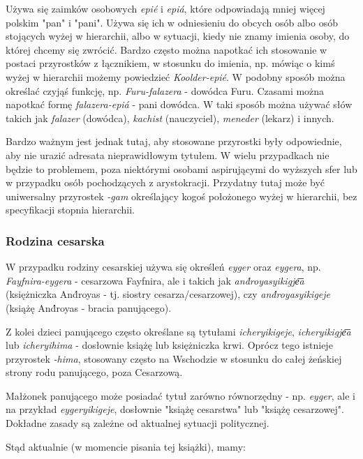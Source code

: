Używa się zaimków osobowych \emph{epié} i \emph{epiá}, które odpowiadają mniej
więcej polskim "pan" i "pani". Używa się ich w odniesieniu do obcych osób albo
osób stojących wyżej w hierarchii, albo w sytuacji, kiedy nie znamy imienia 
osoby, do której chcemy się zwrócić. Bardzo często można napotkać ich stosowanie
w postaci przyrostków z łącznikiem, w stosunku do imienia, np. mówiąc o kimś
wyżej w hierarchii możemy powiedzieć \emph{Koolder-epié}. W podobny sposób
można określać czyjąś funkcję, np. \emph{Furu-falazera} - dowódca Furu. Czasami
można napotkać formę \emph{falazera-epiá} - pani dowódca. W taki sposób można
używać słów takich jak \emph{falazer} (dowódca), \emph{kachist} (nauczyciel), 
\emph{meneder} (lekarz) i innych.

Bardzo ważnym jest jednak tutaj, aby stosowane przyrostki były odpowiednie, aby
nie urazić adresata nieprawidłowym tytułem. W wielu przypadkach nie będzie to
problemem, poza niektórymi osobami aspirującymi do wyższych sfer lub w przypadku
osób pochodzących z arystokracji. Przydatny tutaj może być uniwersalny 
przyrostek \emph{-gam} określający kogoś położonego wyżej w hierarchii, bez
specyfikacji stopnia hierarchii.

\subsubsection{Rodzina cesarska}

W przypadku rodziny cesarskiej używa się określeń \emph{eyger} oraz 
\emph{eygera}, np. \emph{Fayfnira-eygera} - cesarzowa Fayfnira, ale i takich jak 
\emph{and́royasyikigje͞a} (księżniczka And́royas - tj. siostry cesarza/cesarzowej),
czy \emph{and́royasyikigeje} (książę And́royas - bracia panującego).

Z kolei dzieci panującego często określane są tytułami \emph{icheryikigeje}, 
\emph{icheryikigje͞a} lub \emph{icheryihima} - dosłownie książę lub księżniczka 
krwi. Oprócz tego istnieje przyrostek \emph{-hima}, stosowany często na 
Wschodzie w stosunku do całej żeńskiej strony rodu panującego, poza Cesarzową.

Małżonek panującego może posiadać tytuł zarówno równorzędny - np. \emph{eyger},
ale i na przykład \emph{eygeryikigeje}, dosłownie "książę cesarstwa" lub 
"książę cesarzowej". Dokładne zasady są zależne od aktualnej sytuacji 
politycznej.

Stąd aktualnie (w momencie pisania tej książki), mamy:


